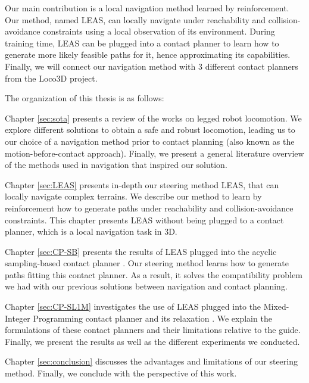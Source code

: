 Our main contribution is a local navigation method learned by reinforcement. 
Our method, named LEAS, can locally navigate under reachability and collision-avoidance constraints using a local observation of its environment.
During training time, LEAS can be plugged into a contact planner to learn how to generate more likely feasible paths for it, hence approximating its capabilities.
Finally, we will connect our navigation method with 3 different contact planners from the Loco3D project.

The organization of this thesis is as follows:

Chapter \ref{sec:sota} presents a review of the works on legged robot locomotion. 
We explore different solutions to obtain a safe and robust locomotion, leading us to our choice of a navigation method prior to contact planning (also known as the motion-before-contact approach). Finally, we present a general literature overview of the methods used in navigation that inspired our solution.

Chapter \ref{sec:LEAS} presents in-depth our steering method LEAS, that can locally navigate complex terrains.
We describe our method to learn by reinforcement how to generate paths under reachability and collision-avoidance constraints.
This chapter presents LEAS without being plugged to a contact planner, which is a local navigation task in 3D.

Chapter \ref{sec:CP-SB} presents the results of LEAS plugged into the acyclic sampling-based contact planner \cite{AcyclicCP}. 
Our steering method learns how to generate paths fitting this contact planner. 
As a result, it solves the compatibility problem we had with our previous solutions between navigation and contact planning.

Chapter \ref{sec:CP-SL1M} investigates the use of LEAS plugged into the Mixed-Integer Programming contact planner and its relaxation \cite{sl1m_v2}. 
We explain the formulations of these contact planners and their limitations relative to the guide. Finally, we present the results as well as the different experiments we conducted.

Chapter \ref{sec:conclusion} discusses the advantages and limitations of our steering method. Finally, we conclude with the perspective of this work.